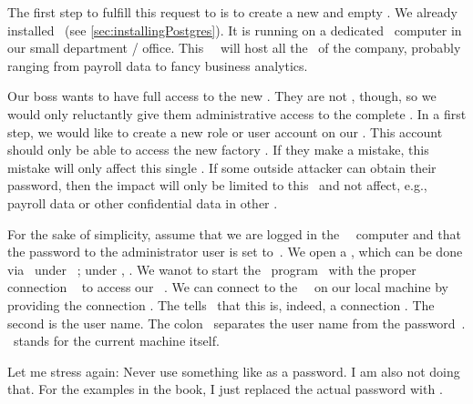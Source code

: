 %
%
%
%
%
The first step to fulfill this request to is to create a new and empty \db.
We already installed \postgresql\ (see \cref{sec:installingPostgres}).
It is running on a dedicated \server\ computer in our small  department / office.
This \db\ \server\ will host all the \dbs\ of the company, probably ranging from payroll data to fancy business analytics.

Our boss wants to have full access to the new \db.
They are not , though, so we would only reluctantly give them administrative access to the complete \server.
In a first step, we would like to create a new role or user account on our \dbms.
This account should only be able to access the new factory \db.
If they make a mistake, this mistake will only affect this single \db.
If some outside attacker can obtain their password, then the impact will only be limited to this \db\ and not affect, e.g., payroll data or other confidential data in other \dbs.

For the sake of simplicity, assume that we are logged in the \db~\server\ computer and that the password to the administrator user  is set to~.
We open a , which can be done via \ubuntuTerminal\ under \ubuntu\ \linux; under \microsoftWindows, \windowsTerminal.
We wanot to start the \client\ program \psql\ with the proper connection ~\cite{PGDG:PD} to access our \postgresql\ \server.
We can connect to the \postgresql\ \server\ on our local machine by providing the connection  .
The  tells \psql\ that this is, indeed, a connection .
The second  is the user name.
The colon~\inQuotes{\textil{:}} separates the user name from the password~.
\localhost\ stands for the current machine itself.

Let me stress again:
Never use something like  as a password.
I am also not doing that.
For the examples in the book, I just replaced the actual password with .

